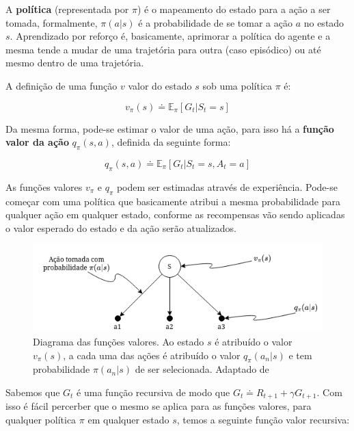 A \textbf{política} (representada por $\pi$) é o mapeamento do estado para a ação a ser tomada, formalmente, $\pi(a|s)$ é a probabilidade de se tomar a ação $a$ no estado $s$. Aprendizado por reforço é, basicamente, aprimorar a política do agente e a mesma tende a mudar de uma trajetória para outra (caso episódico) ou até mesmo dentro de uma trajetória.

A definição de uma função $v$ valor do estado $s$ sob uma política $\pi$ é:

\begin{equation} \label{state-value-function}
   v_\pi(s) \doteq \mathbb{E}_\pi[G_t|S_t=s]
\end{equation}

Da mesma forma, pode-se estimar o valor de uma ação, para isso há a \textbf{função valor da ação} $q_\pi(s,a)$, definida da seguinte forma:

\begin{equation} \label{action-value-function}
   q_\pi(s,a) \doteq \mathbb{E}_\pi[G_t|S_t=s,A_t=a]
\end{equation}

As funções valores $v_\pi$ e $q_\pi$ podem ser estimadas através de experiência. Pode-se começar com uma política que basicamente atribui a mesma probabilidade para qualquer ação em qualquer estado, conforme as recompensas vão sendo aplicadas o valor esperado do estado e da ação serão atualizados.

\begin{figure}[h]
   \centering
   \includegraphics[scale=0.75]{figs/action-selection-diagram.drawio.png}
    \caption{Diagrama das funções valores. Ao estado $s$ é atribuído o valor $v_\pi(s)$, a cada uma das ações é atribuído o valor $q_\pi(a_n|s)$ e tem probabilidade $\pi(a_n|s)$ de ser selecionada. Adaptado de }
    \label{fig:policy-diagram}
 \end{figure}

Sabemos que $G_t$ é uma função recursiva de modo que $G_t \doteq R_{t+1} + \gamma G_{t+1}$. Com isso é fácil percerber que o mesmo se aplica para as funções valores, para qualquer política $\pi$ em qualquer estado $s$, temos a seguinte função valor recursiva:

